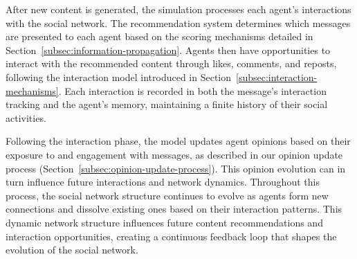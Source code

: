 

After new content is generated, the simulation processes each agent's interactions with the social network. The recommendation system   determines which messages are presented to each agent based on the scoring mechanisms detailed in Section~\ref{subsec:information-propagation}. Agents then have opportunities to interact with the recommended content through likes, comments, and reposts, following the interaction model introduced in Section~\ref{subsec:interaction-mechanisms}. Each interaction is recorded in both the message's interaction tracking and the agent's memory, maintaining a finite history of their social activities.

Following the interaction phase, the model updates agent opinions based on their exposure to and engagement with messages, as described in our opinion update process (Section~\ref{subsec:opinion-update-process}). This opinion evolution can in turn influence future interactions and network dynamics. Throughout this process, the social network structure continues to evolve as agents form new connections and dissolve existing ones based on their interaction patterns. This dynamic network structure influences future content recommendations and interaction opportunities, creating a continuous feedback loop that shapes the evolution of the social network.